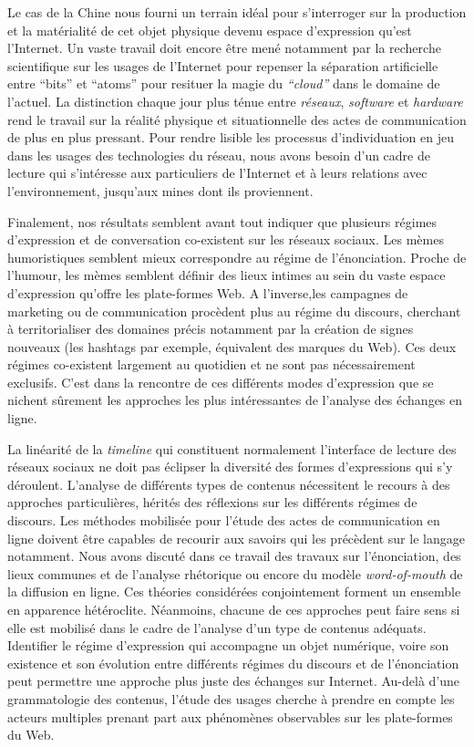 Le cas de la Chine nous fourni un terrain idéal pour s'interroger sur la production et la matérialité de cet objet physique devenu espace d'expression qu'est l'Internet. Un vaste travail doit encore être mené notamment par la recherche scientifique sur les usages de l'Internet pour repenser  la séparation artificielle entre ``bits'' et ``atoms'' pour resituer la magie du \textit{``cloud''} dans le domaine de l'actuel. La distinction chaque jour plus ténue entre \textit{réseaux}, \textit{software} et \textit{hardware} rend le travail sur la réalité physique et situationnelle des actes de communication de plus en plus pressant. Pour rendre lisible les processus d'individuation en jeu dans les usages des technologies du réseau, nous avons besoin d'un cadre de lecture qui s'intéresse aux particuliers de l'Internet et à leurs relations avec l'environnement, jusqu'aux mines dont ils proviennent.

Finalement, nos résultats semblent avant tout indiquer que plusieurs régimes d'expression et de conversation co-existent sur les réseaux sociaux. Les mèmes humoristiques semblent mieux correspondre au régime de l'énonciation. Proche de l'humour, les mèmes semblent définir des lieux intimes au sein du vaste espace d'expression qu'offre les plate-formes Web. A l'inverse,les campagnes de marketing ou de communication procèdent plus au régime du discours, cherchant à territorialiser des domaines précis notamment par la création de signes nouveaux (les hashtags par exemple, équivalent des marques du Web). Ces deux régimes co-existent largement au quotidien et ne sont pas nécessairement exclusifs. C'est dans la rencontre de ces différents modes d'expression que se nichent sûrement les approches les plus intéressantes de l'analyse des échanges en ligne.

La linéarité de la \textit{timeline} qui constituent normalement l'interface de lecture des réseaux sociaux ne doit pas éclipser la diversité des formes d'expressions qui s'y déroulent. L'analyse de différents types de contenus nécessitent le recours à des approches particulières, hérités des réflexions sur les différents régimes de discours. Les méthodes mobilisée pour l'étude des actes de communication en ligne doivent être capables de recourir aux savoirs qui les précèdent sur le langage notamment. Nous avons discuté dans ce travail des travaux sur l'énonciation, des lieux communes et de l'analyse rhétorique ou encore du modèle \textit{word-of-mouth} de la diffusion en ligne. Ces théories considérées conjointement forment un ensemble en apparence hétéroclite. Néanmoins, chacune de ces approches peut faire sens si elle est mobilisé dans le cadre de l'analyse d'un type de contenus adéquats. Identifier le régime d'expression qui accompagne un objet numérique, voire son existence et son évolution entre différents régimes du discours et de l'énonciation peut permettre une approche plus juste des échanges sur Internet. Au-delà d'une grammatologie des contenus, l'étude des usages cherche à prendre en compte les acteurs multiples prenant part aux phénomènes observables sur les plate-formes du Web. 

